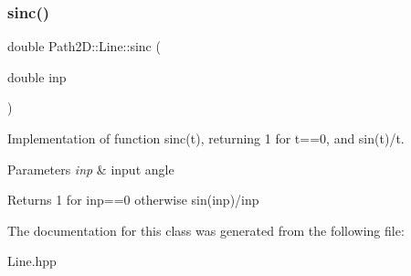 \subsubsection{\texorpdfstring{sinc()}{sinc()}}
{\footnotesize\ttfamily double Path2\+D\+::\+Line\+::sinc (\begin{DoxyParamCaption}\item[{double}]{inp }\end{DoxyParamCaption})}



Implementation of function sinc(t), returning 1 for t==0, and sin(t)/t. 


\begin{DoxyParams}{Parameters}
{\em inp} & input angle \\
\hline
\end{DoxyParams}
\begin{DoxyReturn}{Returns}
1 for inp==0 otherwise sin(inp)/inp 
\end{DoxyReturn}


The documentation for this class was generated from the following file\+:\begin{DoxyCompactItemize}
\item 
Line.\+hpp\end{DoxyCompactItemize}
